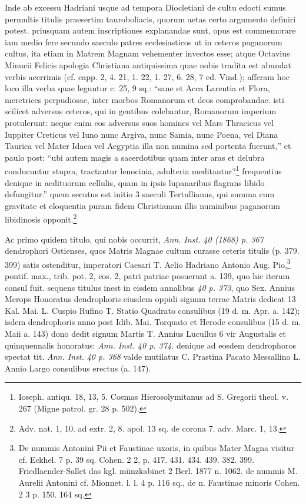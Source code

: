\documentclass[a4paper, 11pt, oneside, polutonikogreek, german]{article}
\begin{document}
Inde ab excessu Hadriani usque ad tempora Diocletiani de cultu edocti sumus permultis titulis praesertim tauroboliacis, quorum aetas certo argumento definiri potest. priusquam autem inscriptiones explanandae sunt, opus est commemorare iam medio fere secundo saeculo patres ecclesiasticos ut in ceteros paganorum cultus, ita etiam in Matrem Magnam vehementer invectos esse; atque Octavius Minucii Felicis apologia Christiana antiquissima quae nobis tradita est abundat verbis acerrimis (cf. capp. 2, 4. 21, 1. 22, 1. 27, 6. 28, 7 ed. Vind.); afferam hoc loco illa verba quae leguntur c. 25, 9 sq.: "`sane et Acca Larentia et Flora, meretrices perpudiosae, inter morbos Romanorum et deos comprobandae. isti scilicet adversus ceteros, qui in gentibus colebantur, Romanorum imperium protulerunt: neque enim eos adversus suos homines vel Mars Thracicus vel Iuppiter Creticus vel Iuno nunc Argiva, nunc Samia, nunc Poena, vel Diana Taurica vel Mater Idaea vel Aegyptia illa non numina sed portenta fuerunt,"' et paulo post: "`ubi autem magis a sacerdotibus quam inter aras et delubra conducuntur stupra, tractantur lenocinia, adulteria meditantur?\footnote{Ioseph. antiqu. 18, 13, 5. Cosmas Hierosolymitanus ad S. Gregorii theol. v. 267 (Migne patrol. gr. 28 p. 502).} frequentius denique in aedituorum cellulis, quam in ipsis lupanaribus flagrans libido defungitur."' quem secutus est initio 3 saeculi Tertullianus, qui summa cum gravitate et eloquentia puram fidem Christianam illis numinibus paganorum libidinosis opponit.\footnote{Adv. nat. 1, 10. ad extr. 2, 8. apol. 13 sq. de corona 7. adv. Marc. 1, 13.}

Ac primo quidem titulo, qui nobis occurrit, \emph{Ann. Inst. 40 (1868) p. 367} dendrophori Ostienses, quos Matris Magnae cultum curasse ceteris titulis (p. 379. 399) satis ostenditur, imperatori Caesari T. Aelio Hadriano Antonio Aug. Pio,\footnote{De nummis Antonini Pii et Faustinae uxoris, in quibus Mater Magna visitur cf. Eckhel. 7 p. 39 sq. Cohen. 2 2, p. 417. 431. 434. 439. 382. 399. Friedlaender-Sallet das kgl. münzkabinet 2 Berl. 1877 n. 1062. de nummis M. Aurelii Antonini cf. Mionnet. l. l. 4 p. 116 sq., de n. Faustinae minoris Cohen. 2 3 p. 150. 164 sq.} pontif. max., trib. pot. 2, cos. 2, patri patriae posuerunt a. 139, quo hic iterum consul fuit. sequens titulus inest in eisdem annalibus \emph{40 p. 373}, quo Sex. Annius Merops Honoratus dendrophoris eiusdem oppidi signum terrae Matris dedicat 13 Kal. Mai. L. Cuspio Rufino T. Statio Quadrato consulibus (19 d. m. Apr. a. 142); isdem dendrophoris anno post Idib. Mai. Torquato et Herode consulibus (15 d. m. Maii a. 143) dono dedit signum Martis T. Annius Lucullus 6 vir Augustalis et quinquennalis honoratus: \emph{Ann. Inst. 40 p. 374.} denique ad eosdem dendrophoros spectat tit. \emph{Ann. Inst. 40 p. 368} valde mutilatus C. Prastina Pacato Messallino L. Annio Largo consulibus erectus (a. 147).
\end{document}
